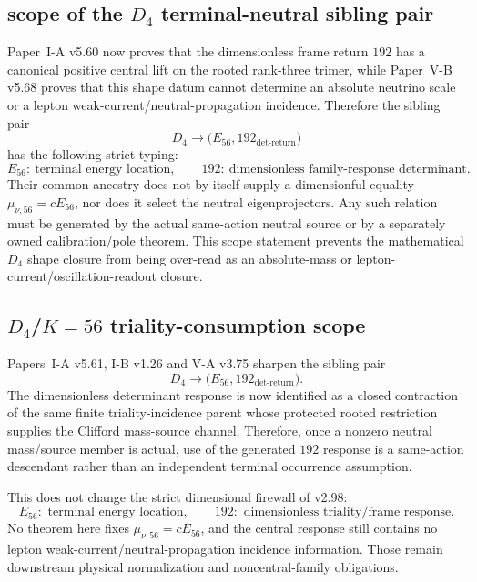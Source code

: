 \documentclass[12pt,a4paper]{article}
\begin{document}
\subsection{scope of the \texorpdfstring{\(D_4\)}{D4} terminal-neutral sibling pair}
\label{p8:sec:v298-d4-k56-neutrino-scope}

Paper~I-A v5.60 now proves that the dimensionless frame return
\(192\) has a canonical positive central lift on the rooted rank-three trimer,
while Paper~V-B v5.68 proves that this shape datum cannot determine an
absolute neutrino scale or a lepton weak-current/neutral-propagation incidence.  Therefore the sibling pair
\[
 D_4\longrightarrow\bigl(E_{56},192_{\det\text{-return}}\bigr)
\]
has the following strict typing:
\[
 \boxed{E_{56}:\ \text{terminal energy location},\qquad
        192:\ \text{dimensionless family-response determinant}.}
\]
Their common ancestry does not by itself supply a dimensionful equality
\(\mu_{\nu,56}=cE_{56}\), nor does it select the neutral eigenprojectors.  Any
such relation must be generated by the actual same-action neutral source or
by a separately owned calibration/pole theorem.  This scope statement
prevents the mathematical \(D_4\) shape closure from being over-read as an
absolute-mass or lepton-current/oscillation-readout closure.


\subsection{\texorpdfstring{\(D_4\)}{D4}/\(K=56\) triality-consumption scope}
\label{p8:sec:v299-d4-k56-triality-consumption-scope}

Papers~I-A v5.61, I-B v1.26 and V-A v3.75 sharpen the sibling pair
\[
 D_4\longrightarrow\bigl(E_{56},192_{\det\text{-return}}\bigr).
\]
The dimensionless determinant response is now identified as a closed
contraction of the same finite triality-incidence parent whose protected rooted
restriction supplies the Clifford mass-source channel.  Therefore, once a
nonzero neutral mass/source member is actual, use of the generated \(192\)
response is a same-action descendant rather than an independent terminal
occurrence assumption.

This does not change the strict dimensional firewall of v2.98:
\[
 \boxed{E_{56}:\text{ terminal energy location},\qquad
 192:\text{ dimensionless triality/frame response}.}
\]
No theorem here fixes \(\mu_{\nu,56}=cE_{56}\), and the central response still
contains no lepton weak-current/neutral-propagation incidence information.  Those remain downstream physical
normalization and noncentral-family obligations.
\end{document}
